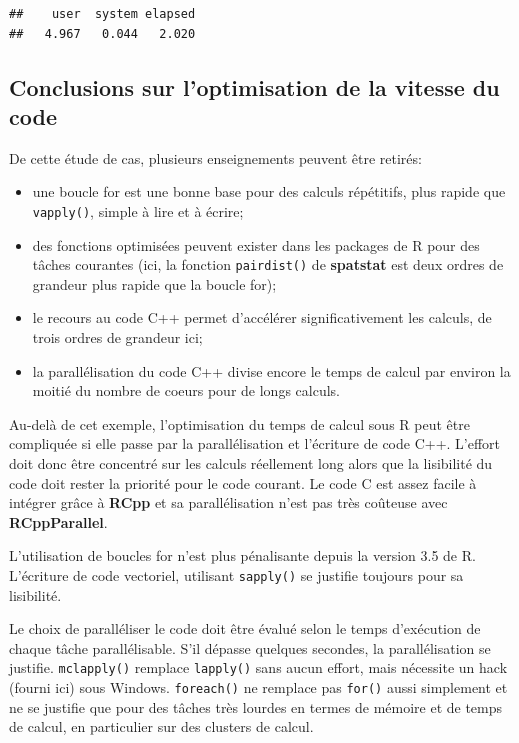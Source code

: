 \documentclass[
  12pt,
  french,
  a4paper,
  extrafontsizes,onecolumn,openright
  ]{memoir}
\providecommand{\tightlist}{%
  \setlength{\itemsep}{0pt}\setlength{\parskip}{0pt}}
\begin{document}
\begin{verbatim}
##    user  system elapsed 
##   4.967   0.044   2.020
\end{verbatim}

\normalsize

\hypertarget{conclusions-sur-loptimisation-de-la-vitesse-du-code}{%
\subsection{Conclusions sur l'optimisation de la vitesse du code}\label{conclusions-sur-loptimisation-de-la-vitesse-du-code}}

De cette étude de cas, plusieurs enseignements peuvent être retirés:

\begin{itemize}
\tightlist
\item
  une boucle for est une bonne base pour des calculs répétitifs, plus rapide que \texttt{vapply()}, simple à lire et à écrire;
\item
  des fonctions optimisées peuvent exister dans les packages de R pour des tâches courantes (ici, la fonction \texttt{pairdist()} de \textbf{spatstat} est deux ordres de grandeur plus rapide que la boucle for);
\item
  le recours au code C++ permet d'accélérer significativement les calculs, de trois ordres de grandeur ici;
\item
  la parallélisation du code C++ divise encore le temps de calcul par environ la moitié du nombre de coeurs pour de longs calculs.
\end{itemize}

Au-delà de cet exemple, l'optimisation du temps de calcul sous R peut être compliquée si elle passe par la parallélisation et l'écriture de code C++.
L'effort doit donc être concentré sur les calculs réellement long alors que la lisibilité du code doit rester la priorité pour le code courant.
Le code C est assez facile à intégrer grâce à \textbf{RCpp} et sa parallélisation n'est pas très coûteuse avec \textbf{RCppParallel}.

L'utilisation de boucles for n'est plus pénalisante depuis la version 3.5 de R.
L'écriture de code vectoriel, utilisant \texttt{sapply()} se justifie toujours pour sa lisibilité.

Le choix de paralléliser le code doit être évalué selon le temps d'exécution de chaque tâche parallélisable.
S'il dépasse quelques secondes, la parallélisation se justifie.
\texttt{mclapply()} remplace \texttt{lapply()} sans aucun effort, mais nécessite un hack (fourni ici) sous Windows.
\texttt{foreach()} ne remplace pas \texttt{for()} aussi simplement et ne se justifie que pour des tâches très lourdes en termes de mémoire et de temps de calcul, en particulier sur des clusters de calcul.
\end{document}
